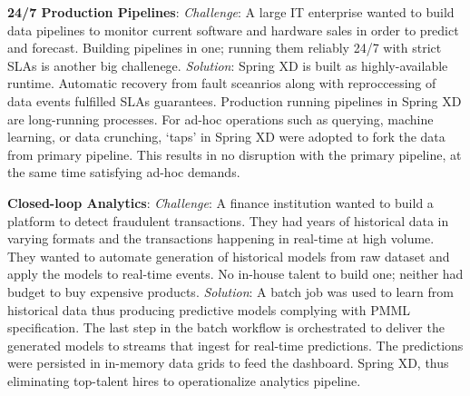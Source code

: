\begin{itemize*}
\item \textbf{24/7 Production Pipelines}: \textit{Challenge}: A large IT enterprise wanted to build data pipelines to monitor current software and hardware sales in order to predict and forecast. Building pipelines in one; running them reliably 24/7 with strict SLAs is another big challenege. \textit{Solution}: Spring XD is built as highly-available runtime. Automatic recovery from fault sceanrios along with reproccessing of data events fulfilled SLAs guarantees. Production running pipelines in Spring XD are long-running processes. For ad-hoc operations such as querying, machine learning, or data crunching, `taps' in Spring XD were adopted to fork the data from primary pipeline. This results in no disruption with the primary pipeline, at the same time satisfying ad-hoc demands.
\item \textbf{Closed-loop Analytics}: \textit{Challenge}: A finance institution wanted to build a platform to detect fraudulent transactions. They had years of historical data in varying formats and the transactions happening in real-time at high volume. They wanted to automate generation of historical models from raw dataset and apply the models to real-time events. No in-house talent to build one; neither had budget to buy expensive products. \textit{Solution}: A batch job was used to learn from historical data thus producing predictive models complying with PMML specification. The last step in the batch workflow is orchestrated to deliver the generated models to streams that ingest for real-time predictions. The predictions were persisted in in-memory data grids to feed the dashboard. Spring XD, thus eliminating top-talent hires to operationalize analytics pipeline.
\end{itemize*}